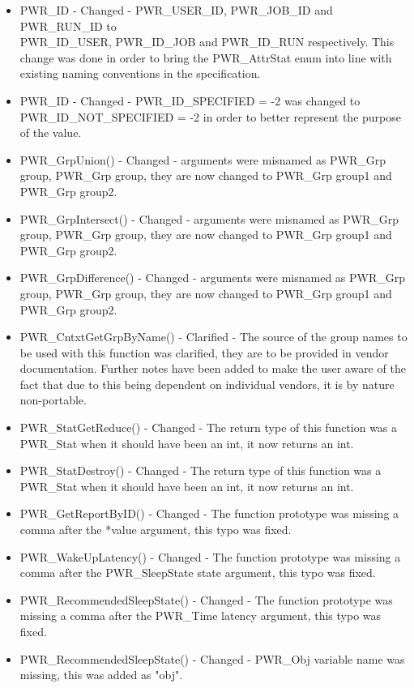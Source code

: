 \begin{itemize}
    \item{PWR_ID - Changed - PWR_USER_ID, PWR_JOB_ID and PWR_RUN_ID to \\
    PWR_ID_USER, PWR_ID_JOB and PWR_ID_RUN respectively. This change was done in order to bring the PWR_AttrStat enum into line with existing naming conventions in the specification.}
    \item{PWR_ID - Changed - PWR_ID_SPECIFIED = -2 was changed to \\
    PWR_ID_NOT_SPECIFIED = -2 in order to better represent the purpose of the value.}
    \item{PWR_GrpUnion() - Changed - arguments were misnamed as PWR_Grp group, PWR_Grp group, they are now changed to PWR_Grp group1 and PWR_Grp group2.} 
    \item{PWR_GrpIntersect() - Changed - arguments were misnamed as PWR_Grp group, PWR_Grp group, they are now changed to PWR_Grp group1 and PWR_Grp group2.}
    \item{PWR_GrpDifference() - Changed - arguments were misnamed as PWR_Grp group, PWR_Grp group, they are now changed to PWR_Grp group1 and PWR_Grp group2.}
    \item{PWR_CntxtGetGrpByName() - Clarified - The source of the group names to be used with this function was clarified, they are to be provided in vendor documentation. Further notes have been added to make the user aware of the fact that due to this being dependent on individual vendors, it is by nature non-portable}.
    \item{PWR_StatGetReduce() - Changed - The return type of this function was a PWR_Stat when it should have been an int, it now returns an int.}
    \item{PWR_StatDestroy() - Changed - The return type of this function was a PWR_Stat when it should have been an int, it now returns an int.}
    \item{PWR_GetReportByID() - Changed - The function prototype was missing a comma after the *value argument, this typo was fixed.}
    \item{PWR_WakeUpLatency() - Changed - The function prototype was missing a comma after the PWR_SleepState state  argument, this typo was fixed.}
    \item{PWR_RecommendedSleepState() - Changed - The function prototype was missing a comma after the PWR_Time latency  argument, this typo was fixed.}
    \item{PWR_RecommendedSleepState() - Changed - PWR_Obj variable name was missing, this was added as "obj".}
\end{itemize}


